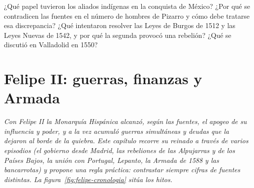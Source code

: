 \documentclass{book}
\begin{document}
\begin{tcolorbox}[title={Autoficha}, studiumcheck, breakable]

¿Qué papel tuvieron los aliados indígenas en la conquista de México? ¿Por qué se contradicen las fuentes en el número de hombres de Pizarro y cómo debe tratarse esa discrepancia? ¿Qué intentaron resolver las Leyes de Burgos de 1512 y las Leyes Nuevas de 1542, y por qué la segunda provocó una rebelión? ¿Qué se discutió en Valladolid en 1550?

\end{tcolorbox}

\chapter{Felipe II: guerras, finanzas y Armada}
\label{chap:hist-03}

\noindent\textit{Con Felipe II la Monarquía Hispánica alcanzó, según las fuentes, el apogeo de su influencia y poder, y a la vez acumuló guerras simultáneas y deudas que la dejaron al borde de la quiebra. Este capítulo recorre su reinado a través de varios episodios (el gobierno desde Madrid, las rebeliones de las Alpujarras y de los Países Bajos, la unión con Portugal, Lepanto, la Armada de 1588 y las bancarrotas) y propone una regla práctica: contrastar siempre cifras de fuentes distintas. La figura~\ref{fig:felipe-cronologia} sitúa los hitos.}

\end{document}
